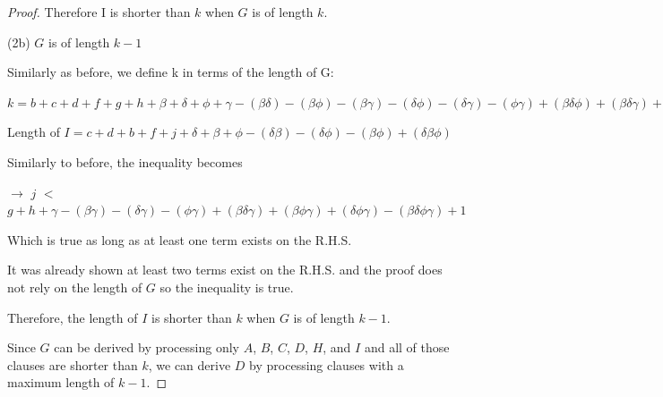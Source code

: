 \documentclass[manuscript]{acmart}
\begin{document}
\begin{proof}
        Therefore I is shorter than $k$ when $G$ is of length $k$.

        (2b) $G$ is of length $k - 1$

        Similarly as before, we define k in terms of the length of G:

        $k = b + c + d + f + g + h
            + \beta + \delta + \phi + \gamma
            - (\beta \delta) - (\beta \phi) - (\beta \gamma) - (\delta \phi) - (\delta \gamma) -(\phi \gamma)
            + (\beta \delta \phi) + (\beta \delta \gamma) + (\beta \phi \gamma) + (\delta \phi \gamma)
            - (\beta \delta \phi \gamma)
            + 1
        $

        Length of $I = c + d + b + f + j
        + \delta + \beta + \phi
        - (\delta \beta) - (\delta \phi) - (\beta \phi)
        + (\delta \beta \phi)
        $

        Similarly to before, the inequality becomes
        
        $\rightarrow$
        $j$
        $<$
        $g + h
            + \gamma
            - (\beta \gamma) - (\delta \gamma) -(\phi \gamma)
            + (\beta \delta \gamma) + (\beta \phi \gamma) + (\delta \phi \gamma)
            - (\beta \delta \phi \gamma)
            + 1
        $

        Which is true as long as at least one term exists on the R.H.S.

        It was already shown at least two terms exist on the R.H.S. and the proof does not rely on the length of $G$ so the inequality is true.

        Therefore, the length of $I$ is shorter than $k$ when $G$ is of length $k - 1$.

        Since $G$ can be derived by processing only $A$, $B$, $C$, $D$, $H$, and $I$ and all of those clauses are shorter than $k$, we can derive $D$ by processing clauses with a maximum length of $k - 1$.
    \end{proof}
\end{document}
